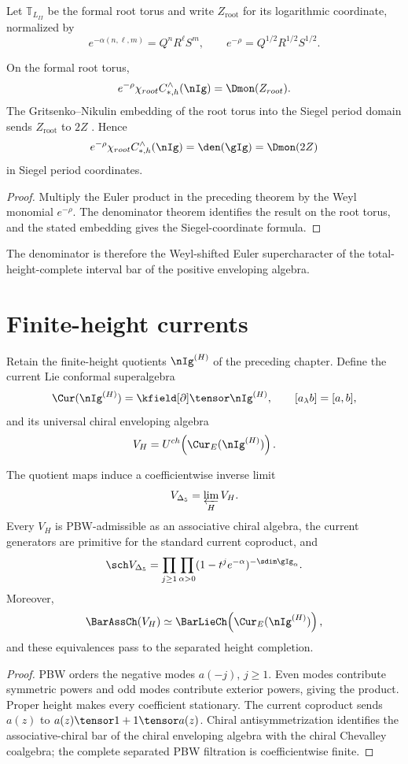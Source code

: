 Let $\mathbb T_{L_{II}}$ be the formal root torus and write $Z_{\mathrm{root}}$ for its logarithmic coordinate, normalized by
\[
 e^{-\alpha(n,\ell,m)}=Q^nR^\ell S^m,
 \qquad
 e^{-\rho}=Q^{1/2}R^{1/2}S^{1/2}.
\]

\begin{corollary}
On the formal root torus,
\[
 e^{-\rho}\chi_{\mathrm{root}}
 C_{*,h}^\wedge(\nIg)
 =\Dmon(Z_{\mathrm{root}}).
\]
The Gritsenko--Nikulin embedding of the root torus into the Siegel period domain sends $Z_{\mathrm{root}}$ to $2Z$ \cite{GN97,GN98b}. Hence
\[
 e^{-\rho}\chi_{\mathrm{root}}
 C_{*,h}^\wedge(\nIg)
 =\den(\gIg)=\Dmon(2Z)
\]
in Siegel period coordinates.
\end{corollary}
\begin{proof}
Multiply the Euler product in the preceding theorem by the Weyl monomial $e^{-\rho}$.  The denominator theorem identifies the result on the root torus, and the stated embedding gives the Siegel-coordinate formula.
\end{proof}

The denominator is therefore the Weyl-shifted Euler supercharacter of the total-height-complete interval bar of the positive enveloping algebra.

\chapter{Finite-height currents}
Retain the finite-height quotients $\nIg^{(H)}$ of the preceding chapter.  Define the current Lie conformal superalgebra
\[
 \Cur(\nIg^{(H)})=\kfield[\partial]\tensor\nIg^{(H)},
 \qquad [a_\lambda b]=[a,b],
\]
and its universal chiral enveloping algebra
\[
 V_H=U^{\ch}\!\left(\Cur_E(\nIg^{(H)})\right).
\]

\begin{theorem}
The quotient maps induce a coefficientwise inverse limit
\[
 \widehat V_{\Delta_5}=\varprojlim_HV_H.
\]
Every $V_H$ is PBW-admissible as an associative chiral algebra, the current generators are primitive for the standard current coproduct, and
\[
 \sch\widehat V_{\Delta_5}
 =\prod_{j\ge1}\prod_{\alpha>0}
 (1-t^je^{-\alpha})^{-\sdim\gIg_\alpha}.
\]
Moreover,
\[
 \BarAssCh(V_H)
 \simeq
 \BarLieCh\!\left(\Cur_E(\nIg^{(H)})\right),
\]
and these equivalences pass to the separated height completion.
\end{theorem}
\begin{proof}
PBW orders the negative modes $a(-j)$, $j\ge1$.  Even modes contribute symmetric powers and odd modes contribute exterior powers, giving the product.  Proper height makes every coefficient stationary.  The current coproduct sends $a(z)$ to $a(z)\tensor1+1\tensor a(z)$.  Chiral antisymmetrization identifies the associative-chiral bar of the chiral enveloping algebra with the chiral Chevalley coalgebra; the complete separated PBW filtration is coefficientwise finite.
\end{proof}

